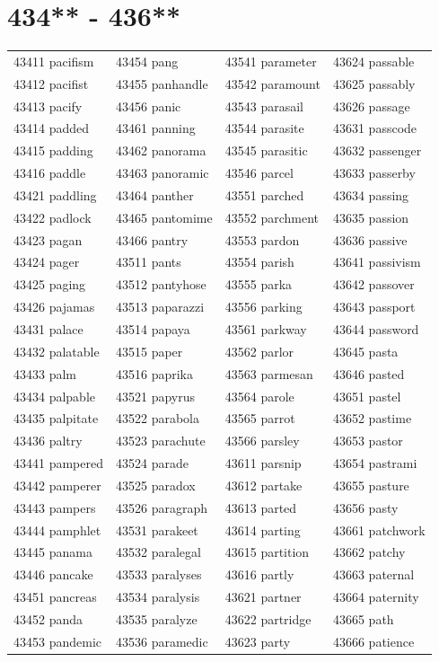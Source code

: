 \documentclass[10pt, oneside]{book}
\begin{document}
\begin{table}
	\centering
	\section*{434** - 436**}
	\begin{tabular}{l l l l}
43411 pacifism &43454 pang &43541 parameter &43624 passable\\
43412 pacifist &43455 panhandle &43542 paramount &43625 passably\\
43413 pacify &43456 panic &43543 parasail &43626 passage\\
43414 padded &43461 panning &43544 parasite &43631 passcode\\
43415 padding &43462 panorama &43545 parasitic &43632 passenger\\
43416 paddle &43463 panoramic &43546 parcel &43633 passerby\\
43421 paddling &43464 panther &43551 parched &43634 passing\\
43422 padlock &43465 pantomime &43552 parchment &43635 passion\\
43423 pagan &43466 pantry &43553 pardon &43636 passive\\
43424 pager &43511 pants &43554 parish &43641 passivism\\
43425 paging &43512 pantyhose &43555 parka &43642 passover\\
43426 pajamas &43513 paparazzi &43556 parking &43643 passport\\
43431 palace &43514 papaya &43561 parkway &43644 password\\
43432 palatable &43515 paper &43562 parlor &43645 pasta\\
43433 palm &43516 paprika &43563 parmesan &43646 pasted\\
43434 palpable &43521 papyrus &43564 parole &43651 pastel\\
43435 palpitate &43522 parabola &43565 parrot &43652 pastime\\
43436 paltry &43523 parachute &43566 parsley &43653 pastor\\
43441 pampered &43524 parade &43611 parsnip &43654 pastrami\\
43442 pamperer &43525 paradox &43612 partake &43655 pasture\\
43443 pampers &43526 paragraph &43613 parted &43656 pasty\\
43444 pamphlet &43531 parakeet &43614 parting &43661 patchwork\\
43445 panama &43532 paralegal &43615 partition &43662 patchy\\
43446 pancake &43533 paralyses &43616 partly &43663 paternal\\
43451 pancreas &43534 paralysis &43621 partner &43664 paternity\\
43452 panda &43535 paralyze &43622 partridge &43665 path\\
43453 pandemic &43536 paramedic &43623 party &43666 patience\\
	\end{tabular}
 \end{table}
\clearpage
\end{document}
